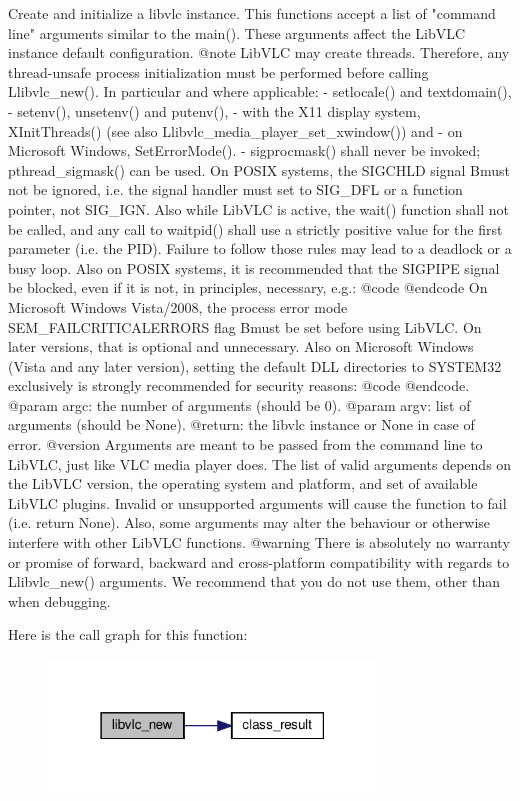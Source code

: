 \begin{DoxyVerb}Create and initialize a libvlc instance.
This functions accept a list of "command line" arguments similar to the
main(). These arguments affect the LibVLC instance default configuration.
@note
LibVLC may create threads. Therefore, any thread-unsafe process
initialization must be performed before calling L{libvlc_new}(). In particular
and where applicable:
- setlocale() and textdomain(),
- setenv(), unsetenv() and putenv(),
- with the X11 display system, XInitThreads()
  (see also L{libvlc_media_player_set_xwindow}()) and
- on Microsoft Windows, SetErrorMode().
- sigprocmask() shall never be invoked; pthread_sigmask() can be used.
On POSIX systems, the SIGCHLD signal B{must not} be ignored, i.e. the
signal handler must set to SIG_DFL or a function pointer, not SIG_IGN.
Also while LibVLC is active, the wait() function shall not be called, and
any call to waitpid() shall use a strictly positive value for the first
parameter (i.e. the PID). Failure to follow those rules may lead to a
deadlock or a busy loop.
Also on POSIX systems, it is recommended that the SIGPIPE signal be blocked,
even if it is not, in principles, necessary, e.g.:
@code
@endcode
On Microsoft Windows Vista/2008, the process error mode
SEM_FAILCRITICALERRORS flag B{must} be set before using LibVLC.
On later versions, that is optional and unnecessary.
Also on Microsoft Windows (Vista and any later version), setting the default
DLL directories to SYSTEM32 exclusively is strongly recommended for
security reasons:
@code
@endcode.
@param argc: the number of arguments (should be 0).
@param argv: list of arguments (should be None).
@return: the libvlc instance or None in case of error.
@version Arguments are meant to be passed from the command line to LibVLC, just like VLC media player does. The list of valid arguments depends on the LibVLC version, the operating system and platform, and set of available LibVLC plugins. Invalid or unsupported arguments will cause the function to fail (i.e. return None). Also, some arguments may alter the behaviour or otherwise interfere with other LibVLC functions. @warning There is absolutely no warranty or promise of forward, backward and cross-platform compatibility with regards to L{libvlc_new}() arguments. We recommend that you do not use them, other than when debugging.
\end{DoxyVerb}
 Here is the call graph for this function\+:
\nopagebreak
\begin{figure}[H]
\begin{center}
\leavevmode
\includegraphics[width=247pt]{namespacevlc_a061db38b4ce8fdc316f730963401676c_cgraph}
\end{center}
\end{figure}
